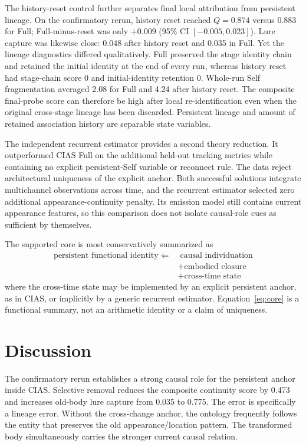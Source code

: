 \documentclass[journal]{IEEEtran}
\begin{document}
The history-reset control further separates final local attribution from persistent lineage. On the confirmatory rerun, history reset reached $Q=0.874$ versus $0.883$ for Full; Full-minus-reset was only $+0.009$ (95\% CI $[-0.005,0.023]$). Lure capture was likewise close: 0.048 after history reset and 0.035 in Full. Yet the lineage diagnostics differed qualitatively. Full preserved the stage identity chain and retained the initial identity at the end of every run, whereas history reset had stage-chain score 0 and initial-identity retention 0. Whole-run Self fragmentation averaged 2.08 for Full and 4.24 after history reset. The composite final-probe score can therefore be high after local re-identification even when the original cross-stage lineage has been discarded. Persistent lineage and amount of retained association history are separable state variables.

The independent recurrent estimator provides a second theory reduction. It outperformed CIAS Full on the additional held-out tracking metrics while containing no explicit persistent-Self variable or reconnect rule. The data reject architectural uniqueness of the explicit anchor. Both successful solutions integrate multichannel observations across time, and the recurrent estimator selected zero additional appearance-continuity penalty. Its emission model still contains current appearance features, so this comparison does not isolate causal-role cues as sufficient by themselves.

The supported core is most conservatively summarized as
\begin{equation}
\boxed{\begin{aligned}
\text{persistent functional identity}\;\Leftarrow\;&\;\text{causal individuation}\\
&+\text{embodied closure}\\
&+\text{cross-time state}
\end{aligned}}
\label{eq:core}
\end{equation}
where the cross-time state may be implemented by an explicit persistent anchor, as in CIAS, or implicitly by a generic recurrent estimator. Equation~\eqref{eq:core} is a functional summary, not an arithmetic identity or a claim of uniqueness.

\section{Discussion}
The confirmatory rerun establishes a strong causal role for the persistent anchor inside CIAS. Selective removal reduces the composite continuity score by 0.473 and increases old-body lure capture from 0.035 to 0.775. The error is specifically a lineage error. Without the cross-change anchor, the ontology frequently follows the entity that preserves the old appearance/location pattern. The transformed body simultaneously carries the stronger current causal relation.
\end{document}

